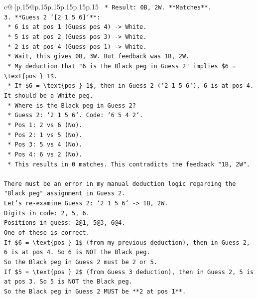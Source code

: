 \documentclass{article}
\begin{document}
{\begin{supertabular}{c@{$\;$}|p{.15\linewidth}@{}p{.15\linewidth}p{.15\linewidth}p{.15\linewidth}p{.15\linewidth}p{.15\linewidth}}
{{{\texttt{    *   Result: 0B, 2W. **Matches**.} \\
\texttt{3.  **Guess 2 `{[}2 1 5 6{]}`**:} \\
\texttt{    *   6 is at pos 1 (Guess pos 4) {-}> White.} \\
\texttt{    *   5 is at pos 2 (Guess pos 3) {-}> White.} \\
\texttt{    *   2 is at pos 4 (Guess pos 1) {-}> White.} \\
\texttt{    *   Wait, this gives 0B, 3W. But feedback was 1B, 2W.} \\
\texttt{    *   My deduction that "6 is the Black peg in Guess 2" implies \$6 = \textbackslash{}text\{pos \} 1\$.} \\
\texttt{    *   If \$6 = \textbackslash{}text\{pos \} 1\$, then in Guess 2 (`2 1 5 6`), 6 is at pos 4. It should be a White peg.} \\
\texttt{    *   Where is the Black peg in Guess 2?} \\
\texttt{    *   Guess 2: `2 1 5 6`. Code: `6 5 4 2`.} \\
\texttt{    *   Pos 1: 2 vs 6 (No).} \\
\texttt{    *   Pos 2: 1 vs 5 (No).} \\
\texttt{    *   Pos 3: 5 vs 4 (No).} \\
\texttt{    *   Pos 4: 6 vs 2 (No).} \\
\texttt{    *   This results in 0 matches. This contradicts the feedback "1B, 2W".} \\
\\ 
\texttt{There must be an error in my manual deduction logic regarding the "Black peg" assignment in Guess 2.} \\
\texttt{Let's re{-}examine Guess 2: `2 1 5 6` {-}> 1B, 2W.} \\
\texttt{Digits in code: 2, 5, 6.} \\
\texttt{Positions in guess: 2@1, 5@3, 6@4.} \\
\texttt{One of these is correct.} \\
\texttt{If \$6 = \textbackslash{}text\{pos \} 1\$ (from my previous deduction), then in Guess 2, 6 is at pos 4. So 6 is NOT the Black peg.} \\
\texttt{So the Black peg in Guess 2 must be 2 or 5.} \\
\texttt{If \$5 = \textbackslash{}text\{pos \} 2\$ (from Guess 3 deduction), then in Guess 2, 5 is at pos 3. So 5 is NOT the Black peg.} \\
\texttt{So the Black peg in Guess 2 MUST be **2 at pos 1**.} \\
}}}
\end{supertabular}}
\end{document}

